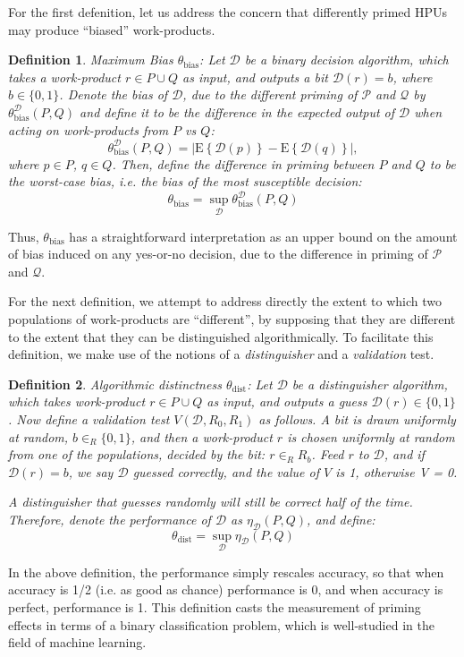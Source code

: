 \documentclass[12pt]{article}
\newtheorem*{mydef}{Definition}
\begin{document}
For the first defenition, let us address the concern that differently primed 
HPUs may produce ``biased'' work-products.

\begin{mydef}
	{\upshape Maximum Bias $\theta_\mathrm{bias}$:}
	Let $\mathcal{D}$ be a binary decision algorithm, which takes a 
	work-product
	$r \in P \cup Q$ as input, and outputs a bit $\mathcal{D}(r)=b$, where 
	$b \in \{0,1\}$. Denote the \emph{bias} of $\mathcal{D}$, due to the
	different priming of $\mathcal{P}$ and $\mathcal{Q}$ by
	$\theta^\mathcal{D}_\mathrm{bias}(P,Q)$ and define it to be the difference 
	in the expected output of $\mathcal{D}$ when acting on work-products from 
	$P$ vs $Q$:
	$$
	\theta^\mathcal{D}_\mathrm{bias}(P,Q) = 
		\left| 
			\mathrm{E}\left\{ \mathcal{D}(p) \right\} 
			- \mathrm{E}\left\{ \mathcal{D}(q) \right\} 
		\right|,
	$$
	where $p \in P$, $q \in Q$.  Then, define the difference in priming 
	between $P$ and $Q$ to be the worst-case bias, i.e. the bias of the most
	susceptible decision:
	$$
	\theta_\mathrm{bias} = 
		\sup_\mathcal{D} \theta^\mathcal{D}_\mathrm{bias}(P,Q)
	$$
\end{mydef}


Thus, $\theta_\mathrm{bias}$ has a straightforward interpretation as an upper 
bound on the amount of bias induced on any yes-or-no decision, due to the 
difference in priming of $\mathcal{P}$ and $\mathcal{Q}$.

For the next definition, we attempt to address directly the extent to which 
two populations of work-products are ``different'', by supposing that they are 
different to the extent that they can be distinguished algorithmically. To 
facilitate this definition, we make use of the notions of a 
\textit{distinguisher} and a \textit{validation} test.

\begin{mydef}
	{\upshape Algorithmic distinctness $\theta_\mathrm{dist}$:}
	Let $\mathcal{D}$ be a distinguisher algorithm, which takes work-product 
	$r \in P \cup Q$ as input, and outputs a \emph{guess} 
	$\mathcal{D}(r) \in \{0, 1\}$. Now define a validation test 
	$V(\mathcal{D}, R_0, R_1)$ as follows. A bit is drawn uniformly at random, 
	$b \in_R \{0, 1\}$, and then a work-product $r$ is chosen uniformly at 
	random from one of the populations, decided by the bit: $r \in_R R_b$. 
	Feed $r$ to $\mathcal{D}$, and if $\mathcal{D}(r) = b$, we say 
	$\mathcal{D}$ guessed correctly, and the value of $V$ is 1, 
	otherwise V = 0.

	A distinguisher that guesses randomly will still be correct half of the 
	time. Therefore, denote the performance of $\mathcal{D}$ as 
	$\eta_\mathcal{D}(P, Q)$, and define:
	$$ 
		\theta_\mathrm{dist} = \sup_\mathcal{D} \eta_\mathcal{D}(P,Q)
	$$

\end{mydef}
In the above definition, the performance simply rescales accuracy, so that when
accuracy is 1/2 (i.e. as good as chance) performance is 0, and when accuracy 
is perfect, performance is 1. This definition casts the measurement of priming 
effects in terms of a binary classification problem, which is well-studied in 
the field of machine learning.
\end{document}
